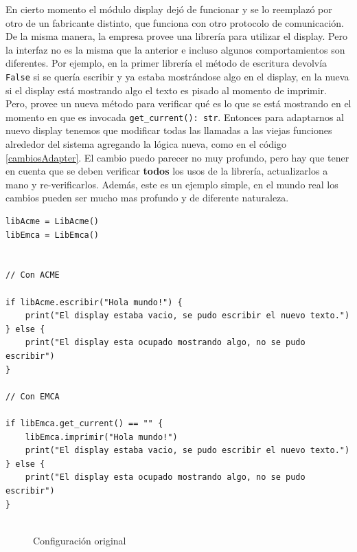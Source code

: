 En cierto momento el módulo display dejó de funcionar y se lo reemplazó por otro de un fabricante distinto, que funciona con otro protocolo de comunicación. De la misma manera, la empresa provee una librería para utilizar el display. Pero la interfaz no es la misma que la anterior e incluso algunos comportamientos son diferentes. Por ejemplo, en la primer librería el método de escritura devolvía \verb|False| si se quería escribir y ya estaba mostrándose algo en el display, en la nueva si el display está mostrando algo el texto es pisado al momento de imprimir. Pero, provee un nueva método para verificar qué es lo que se está mostrando en el momento en que es invocada \verb|get_current(): str|. Entonces para adaptarnos al nuevo display tenemos que modificar todas las llamadas a las viejas funciones alrededor del sistema agregando la lógica nueva, como en el código \ref{cambiosAdapter}. El cambio puedo parecer no muy profundo, pero hay que tener en cuenta que se deben verificar \textbf{todos} los usos de la librería, actualizarlos a mano y re-verificarlos. Además, este es un ejemplo simple, en el mundo real los cambios pueden ser mucho mas profundo y de diferente naturaleza.

\begin{lstlisting}[label={cambiosAdapter}, caption=Ejemplo de modificaciones necesarias para adaptar la nueva librería.]
libAcme = LibAcme()
libEmca = LibEmca()


// Con ACME

if libAcme.escribir("Hola mundo!") {
	print("El display estaba vacio, se pudo escribir el nuevo texto.")
} else {
	print("El display esta ocupado mostrando algo, no se pudo escribir")
}

// Con EMCA

if libEmca.get_current() == "" {
	libEmca.imprimir("Hola mundo!")
	print("El display estaba vacio, se pudo escribir el nuevo texto.")
} else {
	print("El display esta ocupado mostrando algo, no se pudo escribir")
}


\end{lstlisting}


\begin{figure}[!h]
\caption{Configuración original}
\begin{center}
\end{center}
\end{figure}

